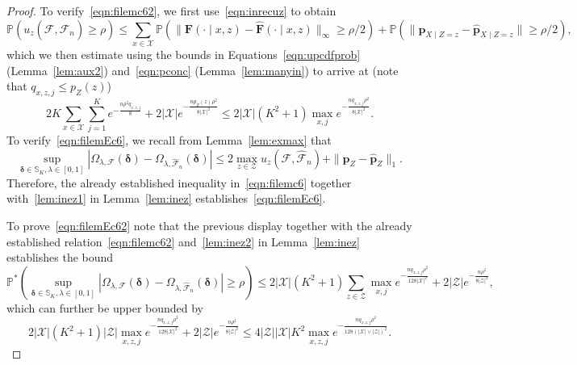 \documentclass[11pt, a4paper]{article}
\theoremstyle{definition}
\begin{document}
\begin{proof}
To verify~\eqref{eqn:filemc62}, we first use~\eqref{eqn:inrecuz} to obtain
%
\begin{equation*}
\mathbb{P}\left(u_z(\mathcal{F}, \hat{\mathcal{F}}_n) \geq \rho\right) \leq \sum_{x \in \mathcal{X}} \mathbb{P}\left( \|\bm{F}(\cdot \mid  x, z) - \hat{\bm{F}}(\cdot \mid  x, z)\|_{\infty}  \geq \rho/2 \right) + \mathbb{P}\left( \|\bm{p}_{X\mid Z=z} - \hat{\bm{p}}_{X\mid Z=z}\| \geq \rho/2 \right),
\end{equation*}
%
which we then estimate using the bounds in Equations~\eqref{eqn:upcdfprob} (Lemma~\ref{lem:aux2}) and~\eqref{eqn:pconc} (Lemma~\ref{lem:manyin}) to arrive at  (note that $q_{x, z, j} \leq p_Z(z)$) 
%
\begin{equation*}
2K \sum_{x \in \mathcal{X}} \sum_{j = 1}^K e^{-\frac{n \rho^2 q_{x, z, j}}{8}} + 2 |\mathcal{X}| e^{-\frac{np_Z(z)\rho^2}{8|\mathcal{X}|^2}} \leq 2 |\mathcal{X}|
\left(K^2 + 1\right)  \max_{x, j}  e^{-\frac{nq_{x,z,j} \rho^2}{8 |\mathcal{X}|^2 }}.
\end{equation*}
%
To verify~\eqref{eqn:filemEc6}, we recall from Lemma~\ref{lem:exmax} that  $$\sup_{\bm{\delta} \in \mathbb{S}_K, \lambda \in [0, 1]}\left|\Omega_{\lambda, \mathcal{F}}(\bm{\delta}) - \Omega_{\lambda, \hat{\mathcal{F}}_n}(\bm{\delta})\right| \leq  2 \max_{z \in \mathcal{Z}} u_z(\mathcal{F}, \hat{\mathcal{F}}_n) + \|\bm{p}_Z - \hat{\bm{p}}_Z\|_1.$$ Therefore, the already established inequality in~\eqref{eqn:filemc6} together with~\eqref{lem:inez1} in Lemma~\ref{lem:inez} establishes~\eqref{eqn:filemEc6}. 

To prove~\eqref{eqn:filemEc62} note that the previous display together with the already established relation~\eqref{eqn:filemc62} and~\eqref{lem:inez2} in Lemma~\ref{lem:inez} establishes the bound $$\mathbb{P}^*\left( \sup_{\bm{\delta} \in \mathbb{S}_K, \lambda \in [0, 1]} \left|\Omega_{\lambda, \mathcal{F}}(\bm{\delta}) - \Omega_{\lambda, \hat{\mathcal{F}}_n}(\bm{\delta})  \right| \geq \rho \right) \leq 2 |\mathcal{X}| \left(K^2 + 1\right) \sum_{z \in \mathcal{Z}} \max_{x, j}  e^{- \frac{nq_{x,z,j} \rho^2}{128|\mathcal{X}|^2}} + 2 |\mathcal{Z}| e^{-\frac{n\rho^2}{8 |\mathcal{Z}|^2}},$$ which can further be upper bounded by $$2 |\mathcal{X}| \left(K^2 + 1\right) |\mathcal{Z}| \max_{x, z, j}  e^{- \frac{nq_{x,z,j} \rho^2}{128|\mathcal{X}|^2}} + 2 |\mathcal{Z}| e^{-\frac{n\rho^2}{8 |\mathcal{Z}|^2}} \leq 
4 | \mathcal{Z}||\mathcal{X}|K^2 \max_{x, z, j}  e^{- \frac{nq_{x,z,j} \rho^2}{128(|\mathcal{X}| \vee |\mathcal{Z}|)^2}}.$$ 
\end{proof}
\end{document}
